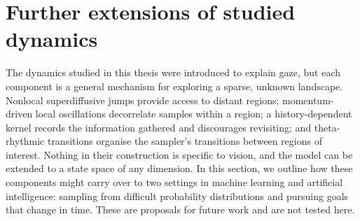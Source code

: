 \section{Further extensions of studied dynamics}\label{sec:further_extensions_of_studied_dynamic}
The dynamics studied in this thesis were introduced to explain gaze, but each component is a general mechanism for exploring a sparse, unknown landscape. Nonlocal superdiffusive jumps provide access to distant regions; momentum-driven local oscillations decorrelate samples within a region; a history-dependent kernel records the information gathered and discourages revisiting; and theta-rhythmic transitions organise the sampler's transitions between regions of interest. Nothing in their construction is specific to vision, and the model can be extended to a state space of any dimension. In this section, we outline how these components might carry over to two settings in machine learning and artificial intelligence: sampling from difficult probability distributions and pursuing goals that change in time. These are proposals for future work and are not tested here.


